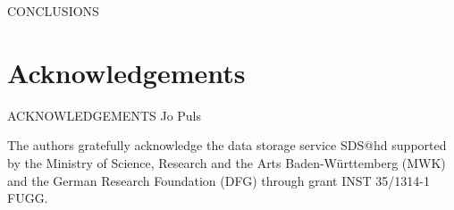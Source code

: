 \documentclass[a4paper,fleqn,usenatbib]{mnras}
\begin{document}
CONCLUSIONS

\section*{Acknowledgements}

ACKNOWLEDGEMENTS
Jo Puls

The authors gratefully acknowledge the data storage service SDS@hd supported by the Ministry of Science, Research and the Arts Baden-W\"urttemberg (MWK) and the German Research Foundation (DFG) through grant INST 35/1314-1 FUGG.








\appendix
%
%



\bsp	%
\label{lastpage}
\end{document}
